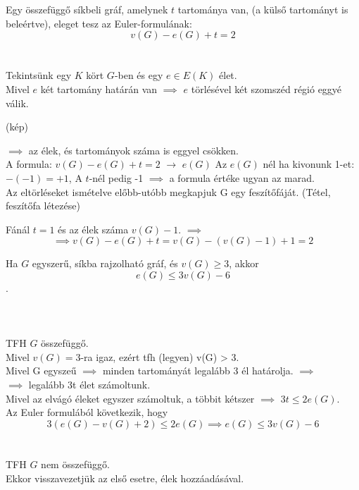 \begin{frame}
\begin{tcolorbox}[title={Tétel: Euler formula}]
Egy összefüggő síkbeli gráf, amelynek $t$ tartománya van, (a külső tartományt is beleértve), eleget tesz az Euler-formulának:
$$v(G) - e(G) + t = 2$$\\
\tcblower
\msmallskip
\underline{}\\
\mmedskip
Tekintsünk egy $K$ kört $G$-ben és egy $e \in E(K)$ élet.\\
Mivel $e$ két tartomány határán van $\implies$ $e$ törlésével két szomszéd régió eggyé válik.

(kép)

$\implies$ az élek, és tartományok száma is eggyel csökken.\\
A formula: $v(G) - e(G) + t = 2$ $\rightarrow$ $e(G)$ Az $e(G)$ nél ha kivonunk 1-et: $-(-1) = +1$, A $t$-nél pedig -1 $\implies$ a formula értéke ugyan az marad.\\

Az eltörléseket ismételve előbb-utóbb megkapjuk G egy feszítőfáját. (Tétel, feszítőfa létezése)

Fánál $t = 1$ és az élek száma $v(G) - 1$. $\implies$
$$\implies v(G) - e(G) + t = v(G) - (v(G) - 1) + 1 = 2$$

\end{tcolorbox}
\end{frame}

\begin{frame}
\begin{tcolorbox}[title={Tétel: Síkgráf élszáma}]
Ha $G$ egyszerű, síkba rajzolható gráf, és $v(G) \geq 3$, akkor $$e(G) \leq 3v(G) - 6$$.\\
\tcblower
\msmallskip
\underline{}\\
\mmedskip
\\
\\
TFH $G$ összefüggő.\\
Mivel $v(G) = 3$-ra igaz, ezért tfh (legyen) v(G) > 3.\\
Mivel G egyszeű $\implies$ minden tartományát legalább 3 él határolja. $\implies$\\
$\implies$ legalább 3t élet számoltunk.\\
Mivel az elvágó éleket egyszer számoltuk, a többit kétszer $\implies$ $3t \leq 2e(G)$.\\
Az Euler formulából következik, hogy $$3(e(G) - v(G) + 2) \leq 2e(G) \implies e(G) \leq 3v(G) - 6$$\\
\msmallskip
{}\\
TFH $G$ nem összefüggő.\\
Ekkor visszavezetjük az első esetre, élek hozzáadásával.
\end{tcolorbox}
\end{frame}

